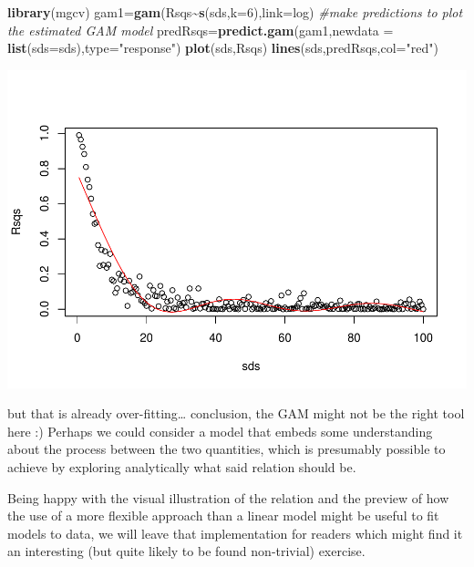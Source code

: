 \documentclass[
]{book}
\newenvironment{Shaded}{\begin{snugshade}}{\end{snugshade}}
\newcommand{\AttributeTok}[1]{\textcolor[rgb]{0.13,0.29,0.53}{#1}}
\newcommand{\CommentTok}[1]{\textcolor[rgb]{0.56,0.35,0.01}{\textit{#1}}}
\newcommand{\DecValTok}[1]{\textcolor[rgb]{0.00,0.00,0.81}{#1}}
\newcommand{\FunctionTok}[1]{\textcolor[rgb]{0.13,0.29,0.53}{\textbf{#1}}}
\newcommand{\NormalTok}[1]{#1}
\newcommand{\OtherTok}[1]{\textcolor[rgb]{0.56,0.35,0.01}{#1}}
\newcommand{\SpecialCharTok}[1]{\textcolor[rgb]{0.81,0.36,0.00}{\textbf{#1}}}
\newcommand{\StringTok}[1]{\textcolor[rgb]{0.31,0.60,0.02}{#1}}
\begin{document}
\begin{Shaded}
\begin{Highlighting}[]
\FunctionTok{library}\NormalTok{(mgcv)}
\NormalTok{gam1}\OtherTok{=}\FunctionTok{gam}\NormalTok{(Rsqs}\SpecialCharTok{\textasciitilde{}}\FunctionTok{s}\NormalTok{(sds,}\AttributeTok{k=}\DecValTok{6}\NormalTok{),}\AttributeTok{link=}\NormalTok{log)}
\CommentTok{\#make predictions to plot the estimated GAM model}
\NormalTok{predRsqs}\OtherTok{=}\FunctionTok{predict.gam}\NormalTok{(gam1,}\AttributeTok{newdata =} \FunctionTok{list}\NormalTok{(}\AttributeTok{sds=}\NormalTok{sds),}\AttributeTok{type=}\StringTok{"response"}\NormalTok{)}
\FunctionTok{plot}\NormalTok{(sds,Rsqs)}
\FunctionTok{lines}\NormalTok{(sds,predRsqs,}\AttributeTok{col=}\StringTok{"red"}\NormalTok{)}
\end{Highlighting}
\end{Shaded}

\includegraphics{ECOMODbook_files/figure-latex/a6.34-1.pdf}

but that is already over-fitting\ldots{} conclusion, the GAM might not be the right tool here :) Perhaps we could consider a model that embeds some understanding about the process between the two quantities, which is presumably possible to achieve by exploring analytically what said relation should be.

Being happy with the visual illustration of the relation and the preview of how the use of a more flexible approach than a linear model might be useful to fit models to data, we will leave that implementation for readers which might find it an interesting (but quite likely to be found non-trivial) exercise.
\end{document}
